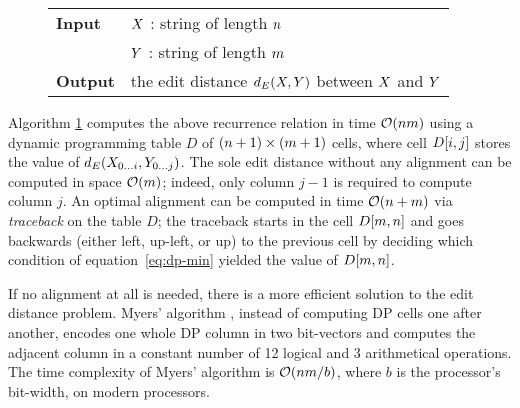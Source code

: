 \begin{figure*}[t]
\begin{center}
\begin{minipage}[t]{.9\textwidth}
\begin{algorithm}[H]
\begin{tabular}{ll}
\textbf{Input}  & $X$ : string of length $n$\\
				& $Y$ : string of length $m$\\
\textbf{Output} & the edit distance $d_E(X,Y)$ between $X$ and $Y$\\
\end{tabular}
\begin{algorithmic}[1]
\EndFor
{}
	\EndFor
\EndFor
\State \Return {}
\end{algorithmic}
\label{alg:dp-edit}
\end{algorithm}
\end{minipage}
\end{center}
\end{figure*}

Algorithm \ref{alg:dp-edit} computes the above recurrence relation in time $\mathcal{O}(nm)$ using a dynamic programming table $D$ of $(n+1) \times (m+1)$ cells, where cell $D[i,j]$ stores the value of $d_E({X}_{{0}\dots{i}},{Y}_{{0}\dots{j}})$.
The sole edit distance without any alignment can be computed in space $\mathcal{O}(m)$; indeed, only column $j-1$ is required to compute column $j$.
An optimal alignment can be computed in time $\mathcal{O}(n + m)$ via \emph{traceback} on the table $D$;
the traceback starts in the cell $D[m,n]$ and goes backwards (either left, up-left, or up) to the previous cell by deciding which condition of equation~\ref{eq:dp-min} yielded the value of $D[m,n]$.

If no alignment at all is needed, there is a more efficient solution to the edit distance problem.
Myers' algorithm \citep{Myers1999}, instead of computing DP cells one after another, encodes one whole DP column in two bit-vectors and computes the adjacent column in a constant number of 12 logical and 3 arithmetical operations.
The time complexity of Myers' algorithm is $\mathcal{O}(nm/b)$, where $b$ is the processor's bit-width,  on modern processors.

